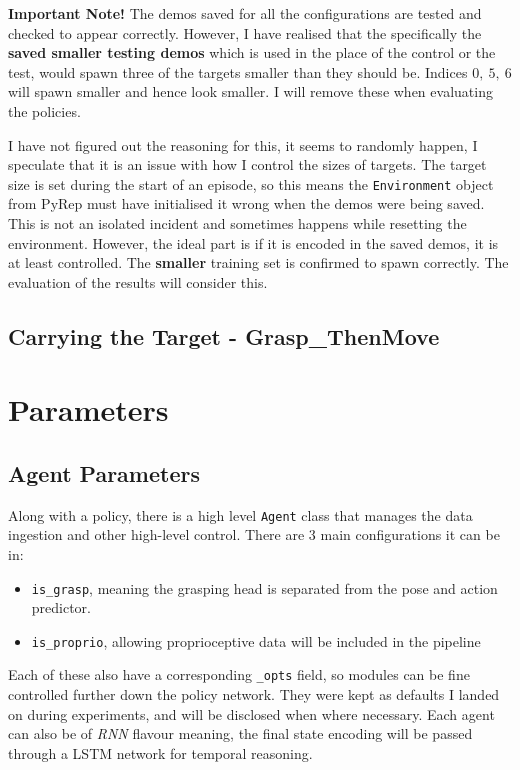 \textbf{Important Note!}
The demos saved for all the configurations are tested and checked to appear correctly. However, I have realised that the specifically the \textbf{saved smaller testing demos} which is used in the place of the control or the test, would spawn three of the targets smaller than they should be. Indices  \(0, ~5, ~6\)  will spawn smaller and hence look smaller. I will remove these when evaluating the policies.

I have not figured out the reasoning for this, it seems to randomly happen, I speculate that it is an issue with how I control the sizes of targets. The target size is set during the start of an episode, so this means the \verb|Environment| object from PyRep must have initialised it wrong when the demos were being saved. This is not an isolated incident and sometimes happens while resetting the environment. However, the ideal part is if it is encoded in the saved demos, it is at least controlled. The \textbf{smaller} training set is confirmed to spawn correctly. The evaluation of the results will consider this.

\subsection{Carrying the Target - \textbf{Grasp\_ThenMove}}

\section{Parameters}

\subsection{Agent Parameters}
Along with a policy, there is a high level \verb|Agent| class that manages the data ingestion and other high-level control. There are 3 main configurations it can be in:
\begin{itemize}
  \item \verb|is_grasp|, meaning the grasping head is separated from the pose and action predictor.
  \item \verb|is_proprio|, allowing proprioceptive data will be included in the pipeline
\end{itemize}
Each of these also have a corresponding \verb|_opts| field, so modules can be fine controlled further down the policy network. They were kept as defaults I landed on during experiments, and will be disclosed when where necessary. Each agent can also be of \emph{RNN} flavour meaning, the final state encoding will be passed through a LSTM network for temporal reasoning.

